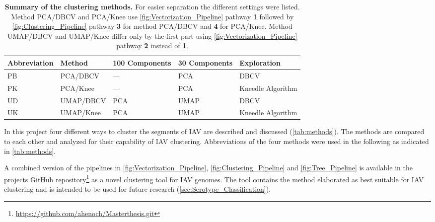 \begin{table}[!hbt]
    \footnotesize
    \centering
    \caption[Summary of the clustering methods]{\textbf{Summary of the clustering methods.} For easier separation the different settings were listed. Method PCA/DBCV and PCA/Knee use \autoref{fig:Vectorization_Pipeline} pathway \textsf{\textbf{1}} followed by \autoref{fig:Clustering_Pipeline} pathway \textsf{\textbf{3}} for method PCA/DBCV and \textsf{\textbf{4}} for PCA/Knee. Method UMAP/DBCV and UMAP/Knee differ only by the first part using \autoref{fig:Vectorization_Pipeline} pathway \textsf{\textbf{2}} instead of \textsf{\textbf{1}}.}
    \label{tab:methods}
    \begin{tabular*}{\textwidth}{@{\extracolsep{\fill}\hspace{6pt}}lllll}
        \toprule
        \textbf{Abbreviation} & \textbf{Method} & \textbf{100 Components} & \textbf{30 Components} & \textbf{Exploration}\\
        \midrule
        PB & PCA/DBCV & --- & PCA & DBCV\\
        PK & PCA/Knee & --- & PCA & Kneedle Algorithm\\
        UD & UMAP/DBCV & PCA & UMAP & DBCV\\
        UK & UMAP/Knee & PCA & UMAP & Kneedle Algorithm\\
        \bottomrule
    \end{tabular*}
\end{table}

In this project four different ways to cluster the segments of \gls{IAV} are described and discussed (\autoref{tab:methods}). The methods are compared to each other and analyzed for their capability of \gls{IAV} clustering. Abbreviations of the four methods were used in the following as indicated in \autoref{tab:methods}.%

\vspace{1em}

A combined version of the pipelines in \autoref{fig:Vectorization_Pipeline}, \autoref{fig:Clustering_Pipeline} and \autoref{fig:Tree_Pipeline} is available in the projects GitHub repository\footnote{\url{https://github.com/ahenoch/Masterthesis.git}} as a novel clustering tool for \gls{IAV} genomes. The tool contains the method elaborated as best suitable for \gls{IAV} clustering and is intended to be used for future research (\autoref{sec:Serotype_Classification}).

